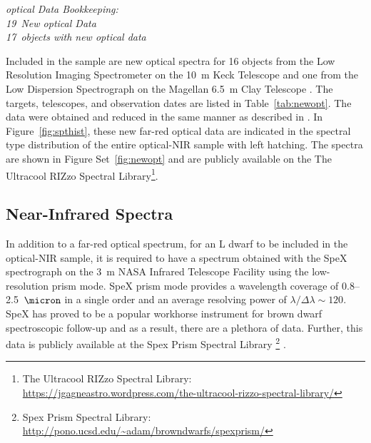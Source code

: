 \documentclass[12pt,preprint]{aastex}
\newcommand{\NewOptSpectra}{19} %
\newcommand{\NewOptObjects}{17} %
\begin{document}

\label{sec:obs_new_opt}

\emph{optical Data Bookkeeping: \\
\NewOptSpectra~New optical Data\\
\NewOptObjects~objects with new optical data\\}

Included in the sample are new optical spectra for 16 objects from the Low Resolution Imaging Spectrometer on the 10~m Keck Telescope \citep[LRIS]{LRIS} and one from the Low Dispersion Spectrograph on the Magellan 6.5~m Clay Telescope \citep[LDSS-3]{LDSS2}.
The targets, telescopes, and observation dates are listed in Table~\ref{tab:newopt}. 
The data were obtained and reduced in the same manner as described in \citet{Kirkpatrick10}. 
In Figure~\ref{fig:spthist}, these new far-red optical data are indicated in the spectral type distribution of the entire optical-NIR sample with left hatching.
The spectra are shown in Figure Set~\ref{fig:newopt} and are publicly available on the The Ultracool RIZzo Spectral Library\footnote{The Ultracool RIZzo Spectral Library: \url{https://jgagneastro.wordpress.com/the-ultracool-rizzo-spectral-library/}}.

\subsection{Near-Infrared Spectra}

In addition to a far-red optical spectrum, for an L dwarf to be included in the optical-NIR sample, it is required to have a spectrum obtained with the SpeX spectrograph \citep{Spex} on the 3~m NASA Infrared Telescope Facility using the low-resolution prism mode.
SpeX prism mode provides a wavelength coverage of 0.8--2.5~$\micron$ in a single order and an average resolving power of $\lambda/\Delta\lambda\sim120$.
SpeX has proved to be a popular workhorse instrument for brown dwarf spectroscopic follow-up and as a result, there are a plethora of data. 
Further, this data is publicly available at the Spex Prism Spectral Library \footnote{Spex Prism Spectral Library: \url{http://pono.ucsd.edu/~adam/browndwarfs/spexprism/}} \citep{Burgasser:2014tr}. 
\end{document}
